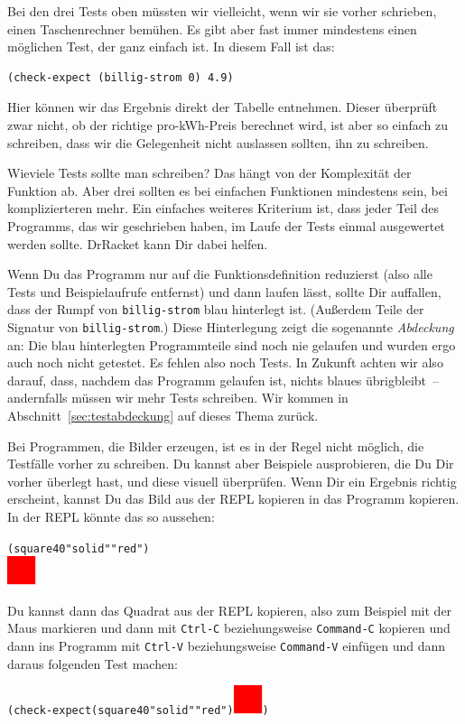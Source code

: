 Bei den drei Tests oben müssten wir vielleicht, wenn wir sie vorher
schrieben, einen Taschenrechner bemühen.  Es gibt aber fast immer
mindestens einen möglichen Test, der ganz einfach ist.  In diesem Fall
ist das:
%
\begin{verbatim}
(check-expect (billig-strom 0) 4.9)
\end{verbatim}
%
Hier können wir das Ergebnis direkt der Tabelle entnehmen.  Dieser
überprüft zwar nicht, ob der richtige pro-kWh-Preis berechnet wird,
ist aber so einfach zu schreiben, dass wir die Gelegenheit nicht
auslassen sollten, ihn zu schreiben.

Wieviele Tests sollte man schreiben?  Das hängt von der Komplexität
der Funktion ab.  Aber drei sollten es bei einfachen Funktionen
mindestens sein, bei komplizierteren mehr.  Ein einfaches weiteres
Kriterium ist, dass jeder Teil des Programms, das wir geschrieben
haben, im Laufe der Tests einmal ausgewertet werden sollte.  DrRacket
kann Dir dabei helfen.

\label{page:abdeckung0}
Wenn Du das Programm nur auf die Funktionsdefinition reduzierst (also
alle Tests und Beispiel\-aufrufe entfernst) und dann laufen lässt,
sollte Dir auffallen, dass der Rumpf von \texttt{billig-strom} blau
hinterlegt ist.  (Außerdem Teile der Signatur von
\texttt{billig-strom}.)  Diese Hinterlegung zeigt die sogenannte
\textit{Abdeckung} an: Die blau hinterlegten
Programmteile sind noch nie gelaufen und wurden ergo auch noch nicht
getestet.  Es fehlen also noch Tests.  In Zukunft achten wir also
darauf, dass, nachdem das Programm gelaufen ist, nichts blaues
übrigbleibt~-- andernfalls müssen wir mehr Tests schreiben.  Wir
kommen in Abschnitt~\ref{sec:testabdeckung} auf dieses Thema zurück.

Bei Programmen, die Bilder erzeugen, ist es in der Regel nicht
möglich, die Testfälle vorher zu schreiben.  Du kannst aber Beispiele
ausprobieren, die Du Dir vorher überlegt hast, und diese visuell überprüfen.
Wenn Dir ein Ergebnis richtig erscheint, kannst Du das Bild aus der
REPL kopieren in das Programm kopieren.  In der REPL könnte das so aussehen:
%
\begin{alltt}
(square 40 "solid" "red")
\evalsto{} \includegraphics[height=24pt]{i1prog/square}
\end{alltt}
%
Du kannst dann das Quadrat aus der REPL kopieren, also zum Beispiel
mit der Maus markieren und dann mit \texttt{Ctrl-C} beziehungsweise
\texttt{Command-C} kopieren und dann ins Programm mit \texttt{Ctrl-V}
beziehungsweise \texttt{Command-V} einfügen und dann daraus folgenden
Test machen:
%
\begin{alltt}
(check-expect (square 40 "solid" "red") \includegraphics[height=24pt]{i1prog/square})
\end{alltt}


